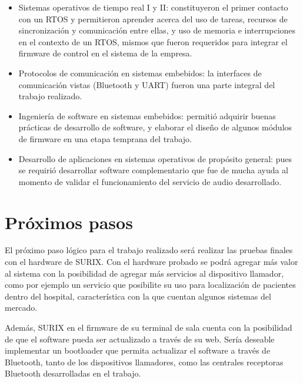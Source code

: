 \begin{itemize}

\item Sistemas operativos de tiempo real I y II: constituyeron el primer contacto con un RTOS y permitieron aprender acerca del uso de tareas, recursos de sincronización y comunicación entre ellas, y uso de memoria e interrupciones en el contexto de un RTOS, mismos que fueron requeridos para integrar el firmware de control en el sistema de la empresa.

\item Protocolos de comunicación en sistemas embebidos: la interfaces de comunicación vistas (Bluetooth y UART) fueron una parte integral del trabajo realizado.

\item Ingeniería de software en sistemas embebidos: permitió adquirir buenas prácticas de desarrollo de software, y elaborar el diseño de algunos módulos de firmware en una etapa temprana del trabajo.

\item Desarrollo de aplicaciones en sistemas operativos de propósito general: pues se requirió desarrollar software complementario que fue de mucha ayuda al momento de validar el funcionamiento del servicio de audio desarrollado.

\end{itemize}


\section{Próximos pasos}

El próximo paso lógico para el trabajo realizado será realizar las pruebas finales con el hardware de SURIX. Con el hardware probado se podrá agregar más valor al sistema con la posibilidad de agregar más servicios al dispositivo llamador, como por ejemplo un servicio que posibilite su uso para localización de pacientes dentro del hospital, característica con la que cuentan algunos sistemas del mercado.

Además, SURIX en el firmware de su terminal de sala cuenta con la posibilidad de que el software pueda ser actualizado a través de su web. Sería deseable implementar un bootloader que permita actualizar el software a través de Bluetooth, tanto de los dispositivos llamadores, como las centrales receptoras Bluetooth desarrolladas en el trabajo.


